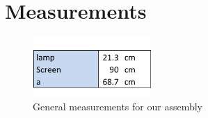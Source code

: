 \documentclass{scrreprt}
\begin{document}
\section{Measurements}

\begin{figure}[H]
	\centering
  \includegraphics[width=0.4\textwidth]{diag/general_measurements.pdf}
	\caption{General measurements for our assembly}
\end{figure}

\begin{figure}[H]
        \centering
        \begin{subfigure}[b]{0.3\textwidth}
                \centering

\end{subfigure}
\end{figure}
\end{document}
